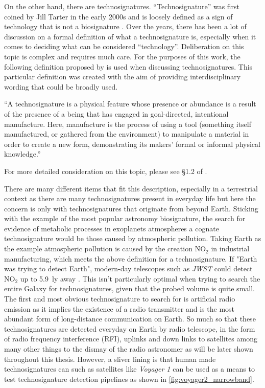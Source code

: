 On the other hand, there are technosignatures. ``Technosignature'' was first coined by Jill Tarter in the early 2000s and is loosely defined as a sign of technology that is not a biosignature \citep{wright_recommendations_2018}. Over the years, there has been a lot of discussion on a formal definition of what a technosignature is, especially when it comes to deciding what can be considered ``technology''. Deliberation on this topic is complex and requires much care. For the purposes of this work, the following definition proposed by \cite{Sheikh2021} is used when discussing technosignatures. This particular definition was created with the aim of providing interdisciplinary wording that could be broadly used. 

\begin{displayquote}
``A technosignature is a physical feature whose presence or abundance is
a result of the presence of a being that has engaged in goal-directed,
intentional manufacture. Here, manufacture is the process of using a
tool (something itself manufactured, or gathered from the environment)
to manipulate a material in order to create a new form, demonstrating
its makers’ formal or informal physical knowledge.''
\end{displayquote}

For more detailed consideration on this topic, please see §1.2 of \cite{Sheikh2021}. 

There are many different items that fit this description, especially in a terrestrial context as there are many technosignatures present in everyday life but here the concern is only with technosignatures that originate from beyond Earth. Sticking with the example of the most popular astronomy biosignature, the search for evidence of metabolic processes in exoplanets atmospheres a cognate technosignature would be those caused by atmospheric pollution. Taking Earth as the example atmospheric pollution is caused by the creation $\text{NO}_2$ in industrial manufacturing, which meets the above definition for a technosignature. If "Earth was trying to detect Earth", modern-day telescopes such as \textit{JWST} could detect $\text{NO}_2$ up to 5.9~ly away \citep{sheikh_earth_2025}. This isn't particularly optimal when trying to search the entire Galaxy for technosignatures, given that the probed volume is quite small. The first and most obvious technosignature to search for is artificial radio emission as it implies the existence of a radio transmitter \citep{CocconiMorrison1959} and is the most abundant form of long-distance communication on Earth. So much so that these technosignatures are detected everyday on Earth by radio telescope, in the form of radio frequency interference (RFI), uplinks and down links to satellites among many other things to the dismay of the radio astronomer as will be later shown throughout this thesis. However, a sliver lining is that human made technosignatures can such as satellites like \textit{Voyager 1} can be used as a means to test technosignature detection pipelines as shown in \cref{fig:voyager2_narrowband}. 

